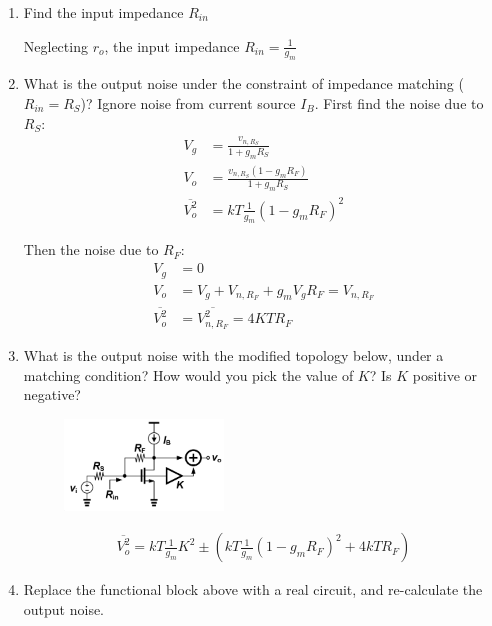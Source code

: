 \begin{enumerate}[label=(\alph*)]
  \item {\color{blue}Find the input impedance $R_{in}$}

    Neglecting $r_o$, the input impedance $R_{in} = \frac{1}{g_m}$

  \item {\color{blue}What is the output noise under the constraint of impedance matching ($R_{in} = R_S$)? Ignore noise from current source $I_B$.}
    First find the noise due to $R_S$:
    \begin{align*}
      V_g &= \frac{v_{n, R_S}}{1 + g_m R_S} \\
      V_o &= \frac{v_{n, R_S}(1 - g_m R_F)}{1 + g_m R_S} \\
      \overline{V_o^2} &= k T \frac{1}{g_m} (1 - g_m R_F)^2
    \end{align*}

    Then the noise due to $R_F$:
    \begin{align*}
      V_g &= 0 \\
      V_o &= V_g + V_{n, R_F} + g_m V_g R_F = V_{n, R_F} \\
      \overline{V_o^2} &= \overline{V_{n, R_F}^2} = 4 K T R_F
    \end{align*}

  \item {\color{blue}What is the output noise with the modified topology below, under a matching condition? How would you pick the value of $K$? Is $K$ positive or negative?}
    \begin{figure}[H]
      \centering
      \includegraphics[width=0.4\textwidth]{figs/problem3c.png}
    \end{figure}
    \begin{align*}
      \overline{V_o^2} = kT \frac{1}{g_m} K^2 \pm (kT \frac{1}{g_m}(1 - g_m R_F)^2 + 4kT R_F)
    \end{align*}
  \item {\color{blue}Replace the functional block above with a real circuit, and re-calculate the output noise.}
\end{enumerate}

